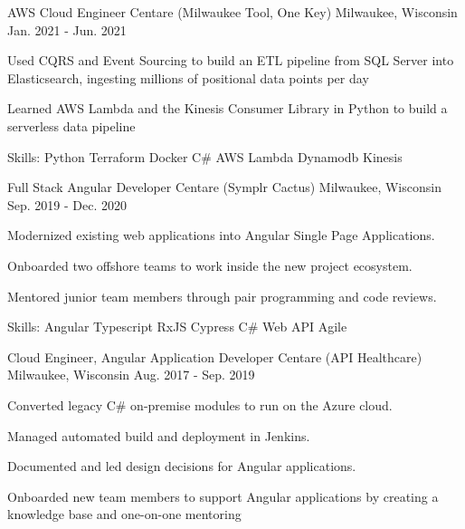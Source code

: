 \begin{cventries}
  \cventry
    {AWS Cloud Engineer} %
    {Centare (Milwaukee Tool, One Key)} %
    {Milwaukee, Wisconsin} %
    {Jan. 2021 - Jun. 2021} %
    {
      \begin{cvitems} %
        \item {Used CQRS and Event Sourcing to build an ETL pipeline from SQL Server into Elasticsearch, ingesting millions of positional data points per day }
        \item {Learned AWS Lambda and the Kinesis Consumer Library in Python to build a serverless data pipeline}
        \item {Skills: Python \textbullet{} Terraform \textbullet{} Docker \textbullet{} C\# \textbullet{} AWS Lambda \textbullet{} Dynamodb \textbullet{} Kinesis}
      \end{cvitems}
 }

  \cventry
    {Full Stack Angular Developer} %
    {Centare (Symplr Cactus)} %
    {Milwaukee, Wisconsin} %
    {Sep. 2019 - Dec. 2020} %
    {
      \begin{cvitems} %
        \item {Modernized existing web applications into Angular Single Page Applications.}
        \item {Onboarded two offshore teams to work inside the new project ecosystem.}
        \item {Mentored junior team members through pair programming and code reviews.}
        \item {Skills: Angular \textbullet{} Typescript \textbullet{} RxJS \textbullet{} Cypress \textbullet{} C\# Web API \textbullet{} Agile}
      \end{cvitems}
    }

  \cventry
    {Cloud Engineer, Angular Application Developer} %
    {Centare (API Healthcare)} %
    {Milwaukee, Wisconsin} %
    {Aug. 2017 - Sep. 2019} %
    {
      \begin{cvitems} %
        \item {Converted legacy C\# on-premise modules to run on the Azure cloud.}
        \item {Managed automated build and deployment in Jenkins.}
        \item {Documented and led design decisions for Angular applications.}
        \item {Onboarded new team members to support Angular applications by creating a knowledge base and one-on-one mentoring}
      \end{cvitems}
    }


\end{cventries}
